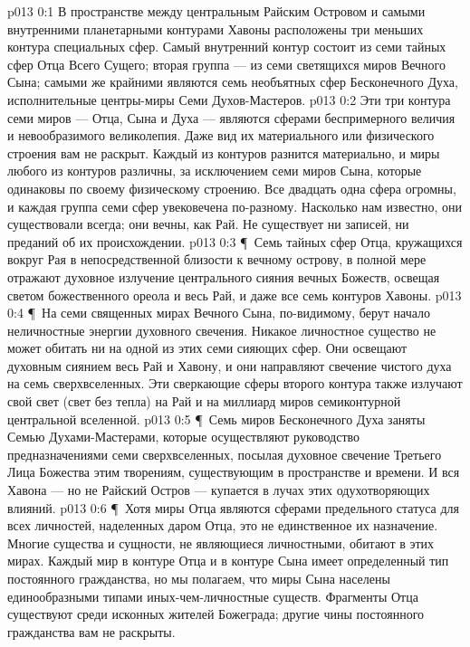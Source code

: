 \author{Совершенствователь Мудрости}
\vs p013 0:1 В пространстве между центральным Райским Островом и самыми внутренними планетарными контурами Хавоны расположены три меньших контура специальных сфер. Самый внутренний контур состоит из семи тайных сфер Отца Всего Сущего; вторая группа --- из семи светящихся миров Вечного Сына; самыми же крайними являются семь необъятных сфер Бесконечного Духа, исполнительные центры\hyp{}миры Семи Духов\hyp{}Мастеров.
\vs p013 0:2 Эти три контура семи миров --- Отца, Сына и Духа --- являются сферами беспримерного величия и невообразимого великолепия. Даже вид их материального или физического строения вам не раскрыт. Каждый из контуров разнится материально, и миры любого из контуров различны, за исключением семи миров Сына, которые одинаковы по своему физическому строению. Все двадцать одна сфера огромны, и каждая группа семи сфер увековечена по\hyp{}разному. Насколько нам известно, они существовали всегда; они вечны, как Рай. Не существует ни записей, ни преданий об их происхождении.
\vs p013 0:3 \P\ Семь тайных сфер Отца, кружащихся вокруг Рая в непосредственной близости к вечному острову, в полной мере отражают духовное излучение центрального сияния вечных Божеств, освещая светом божественного ореола и весь Рай, и даже все семь контуров Хавоны.
\vs p013 0:4 \P\ На семи священных мирах Вечного Сына, по\hyp{}видимому, берут начало неличностные энергии духовного свечения. Никакое личностное существо не может обитать ни на одной из этих семи сияющих сфер. Они освещают духовным сиянием весь Рай и Хавону, и они направляют свечение чистого духа на семь сверхвселенных. Эти сверкающие сферы второго контура также излучают свой свет (свет без тепла) на Рай и на миллиард миров семиконтурной центральной вселенной.
\vs p013 0:5 \P\ Семь миров Бесконечного Духа заняты Семью Духами\hyp{}Мастерами, которые осуществляют руководство предназначениями семи сверхвселенных, посылая духовное свечение Третьего Лица Божества этим творениям, существующим в пространстве и времени. И вся Хавона --- но не Райский Остров --- купается в лучах этих одухотворяющих влияний.
\vs p013 0:6 \P\ Хотя миры Отца являются сферами предельного статуса для всех личностей, наделенных даром Отца, это не единственное их назначение. Многие существа и сущности, не являющиеся личностными, обитают в этих мирах. Каждый мир в контуре Отца и в контуре Сына имеет определенный тип постоянного гражданства, но мы полагаем, что миры Сына населены единообразными типами иных\hyp{}чем\hyp{}личностные существ. Фрагменты Отца существуют среди исконных жителей Божеграда; другие чины постоянного гражданства вам не раскрыты.

